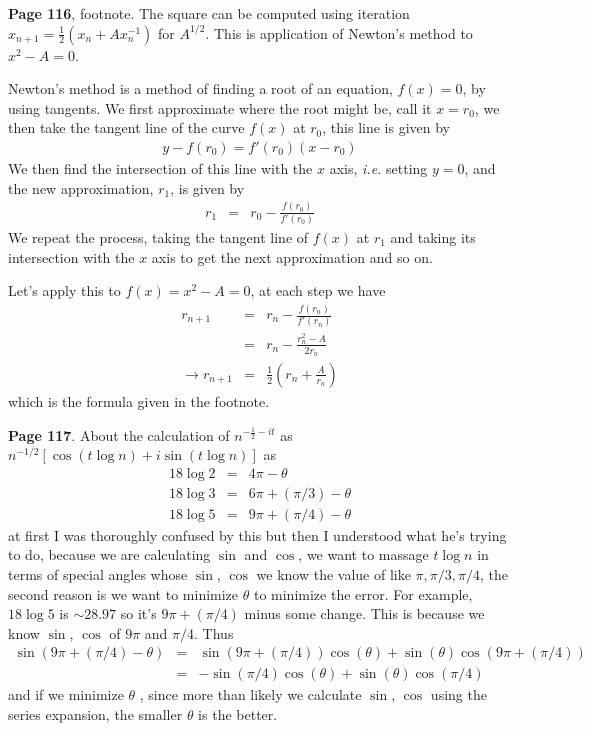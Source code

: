\documentclass[aps,preprint,preprintnumbers,nofootinbib,showpacs,prd]{revtex4-1}
\newcommand{\ie}{{\it i.e.} }
\newcommand{\nbea}{\begin{eqnarray*}}
\newcommand{\neea}{\end{eqnarray*}}
\begin{document}
{\bf Page 116}, footnote. The square can be computed using iteration $x_{n+1} = \frac{1}{2}(x_n + Ax_n^{-1})$ for $A^{1/2}$. This is application of Newton's method to $x^2 - A = 0$.

Newton's method is a method of finding a root of an equation, $f(x) = 0$, by using tangents. We first approximate where the root might be, call it $x = r_0$, we then take the tangent line of the curve $f(x)$ at $r_0$, this line is given by
%
\nbea
y - f(r_0) = f'(r_0) (x - r_0)
\neea
%
We then find the intersection of this line with the $x$ axis, \ie setting $y = 0$, and the new approximation, $r_1$, is given by
%
\nbea
r_1 & = & r_0 - \frac{f(r_0)}{f'(r_0)}
\neea
%
We repeat the process, taking the tangent line of $f(x)$ at $r_1$ and taking its intersection with the $x$ axis to get the next approximation and so on.

Let's apply this to $f(x) = x^2 - A = 0$, at each step we have
%
\nbea
r_{n+1} & = & r_{n} - \frac{f(r_n)}{f'(r_n)} \\
& = & r_n - \frac{r^2_n - A}{2 r_n} \\
\to r_{n+1} & = & \frac{1}{2} \left ( r_n + \frac{A}{r_n}\right )
\neea
%
which is the formula given in the footnote.

{\bf Page 117}. About the calculation of $n^{-\frac{1}{2} - it}$ as $n^{-1/2}[\cos(t\log n) + i\sin(t\log n)]$ as
%
\nbea
18 \log 2 & = & 4\pi -\theta \\
18 \log 3 &= & 6\pi + (\pi/3) - \theta \\
18 \log 5 & = & 9\pi + (\pi/4) - \theta
\neea
%
at first I was thoroughly confused by this but then I understood what he's trying to do, because we are calculating $\sin$ and $\cos$, we want to massage $t\log n$ in terms of special angles whose $\sin$, $\cos$ we know the value of like $\pi, \pi/3, \pi/4$, the second reason is we want to minimize $\theta$ to minimize the error. For example, $18 \log 5$ is $\sim 28.97$ so it's $9\pi + (\pi/4)$ minus some change. This is because we know $\sin$, $\cos$ of $9\pi$ and $\pi/4$. Thus
%
\nbea
\sin(9\pi + (\pi/4) - \theta) & = & \sin(9\pi + (\pi/4))\cos(\theta) + \sin(\theta)\cos(9\pi + (\pi/4)) \\
& = & -\sin(\pi/4)\cos(\theta) + \sin(\theta)\cos(\pi/4)
\neea
%
and if we minimize $\theta$ , since more than likely we calculate $\sin$, $\cos$ using the series expansion, the smaller $\theta$ is the better.
\end{document}
